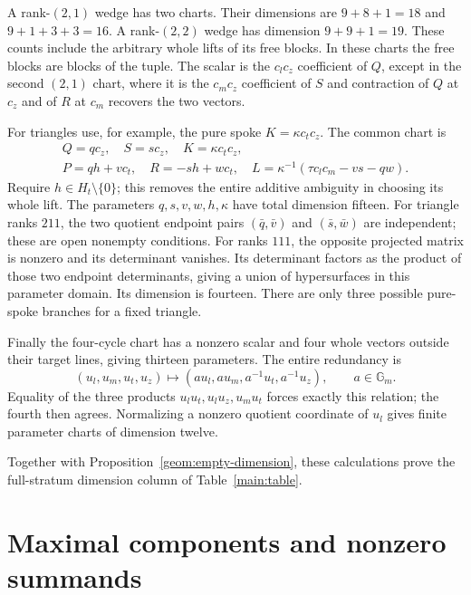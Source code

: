 \documentclass[11pt,letterpaper]{article}
\newcommand{\Gm}{\mathbb G_m}
\theoremstyle{definition}
\begin{document}
A rank-\((2,1)\) wedge has two charts. Their dimensions are
\(9+8+1=18\) and \(9+1+3+3=16\).
A rank-\((2,2)\) wedge has dimension \(9+9+1=19\).
These counts include the arbitrary whole lifts of its free blocks.
In these charts the free blocks are blocks of the tuple. The scalar is
the \(c_lc_z\) coefficient of \(Q\), except in the second \((2,1)\)
chart, where it is the \(c_mc_z\) coefficient of \(S\) and contraction
of \(Q\) at \(c_z\) and of \(R\) at \(c_m\) recovers the two vectors.

For triangles use, for example, the pure spoke \(K=\kappa c_tc_z\).
The common chart is
\begin{equation}\label{geom:triangle-chart}
 \begin{gathered}
 Q=q c_z,\quad S=s c_z,\quad K=\kappa c_tc_z,\\
 P=qh+v c_t,\quad R=-sh+w c_t,\quad
 L=\kappa^{-1}(\tau c_lc_m-vs-qw).
 \end{gathered}
\end{equation}
Require \(h\in H_t\setminus\{0\}\); this removes the entire additive
ambiguity in choosing its whole lift. The parameters
\(q,s,v,w,h,\kappa\) have total dimension fifteen.
For triangle ranks \(211\), the two quotient endpoint pairs
\((\bar q,\bar v)\) and \((\bar s,\bar w)\) are independent; these
are open nonempty conditions. For ranks \(111\), the opposite projected
matrix is nonzero and its determinant vanishes. Its determinant factors
as the product of those two endpoint determinants, giving a union of
hypersurfaces in this parameter domain. Its dimension is fourteen.
There are only three possible pure-spoke branches for a fixed triangle.

Finally the four-cycle chart has a nonzero scalar and four whole vectors
outside their target lines, giving thirteen parameters. The entire
redundancy is
\[
 (u_l,u_m,u_t,u_z)\longmapsto
 (a u_l,a u_m,a^{-1}u_t,a^{-1}u_z),\qquad a\in\Gm.
\]
Equality of the three products \(u_lu_t,u_lu_z,u_mu_t\) forces exactly
this relation; the fourth then agrees. Normalizing a nonzero quotient
coordinate of \(u_l\) gives finite parameter charts of dimension twelve.

Together with Proposition~\ref{geom:empty-dimension}, these calculations
prove the full-stratum dimension column of Table~\ref{main:table}.

\section{Maximal components and nonzero summands}
\end{document}
